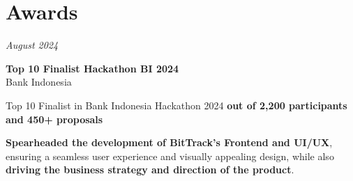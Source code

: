 \documentclass[../main.tex]{subfiles}
\begin{document}
     \section{Awards}

        \begin{twocolentry}{
        \textit{August 2024}}

            \textbf{Top 10 Finalist Hackathon BI 2024}\\
            Bank Indonesia

        \end{twocolentry}
        \vspace{0.10 cm}
        \begin{onecolentry}
            \begin{highlights}
            \item Top 10 Finalist in Bank Indonesia Hackathon 2024 \textbf{out of 2,200 participants and 450+ proposals} 
            \item \textbf{Spearheaded the development of BitTrack's Frontend and UI/UX}, ensuring a seamless user experience and visually appealing design, while also \textbf{driving the business strategy and direction of the product}.
            \end{highlights}
        \end{onecolentry}
\end{document}
